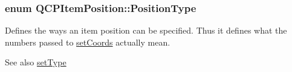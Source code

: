 \subsubsection[{\texorpdfstring{Position\+Type}{PositionType}}]{\setlength{\rightskip}{0pt plus 5cm}enum {\bf Q\+C\+P\+Item\+Position\+::\+Position\+Type}}\hypertarget{class_q_c_p_item_position_aad9936c22bf43e3d358552f6e86dbdc8}{}\label{class_q_c_p_item_position_aad9936c22bf43e3d358552f6e86dbdc8}
Defines the ways an item position can be specified. Thus it defines what the numbers passed to \hyperlink{class_q_c_p_item_position_aa988ba4e87ab684c9021017dcaba945f}{set\+Coords} actually mean.

\begin{DoxySeeAlso}{See also}
\hyperlink{class_q_c_p_item_position_aa476abf71ed8fa4c537457ebb1a754ad}{set\+Type} 
\end{DoxySeeAlso}
